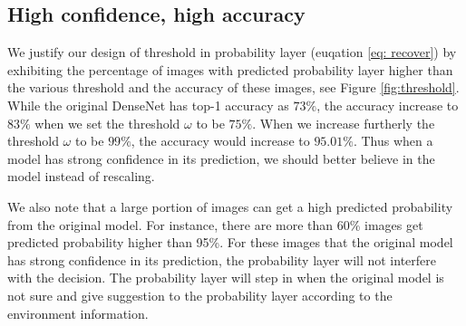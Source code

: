 \documentclass[pageno]{jpaper}
\begin{document}
\subsection{High confidence, high accuracy}
We justify our design of threshold in probability layer (euqation \ref{eq: recover}) by exhibiting the percentage of images with predicted probability layer higher than the various threshold and the accuracy of these images, see Figure \ref{fig:threshold}. While the original DenseNet has top-1 accuracy as $73\%$, the accuracy increase to $83\%$ when we set the threshold $\omega$ to be $75\%$. When we increase furtherly the threshold $\omega$ to be $99\%$, the accuracy would increase to $95.01\%$. Thus when a model has strong confidence in its prediction, we should better believe in the model instead of rescaling. 

We also note that a large portion of images can get a high predicted probability from the original model. For instance, there are more than 60\% images get predicted probability higher than 95\%. For these images that the original model has strong confidence in its prediction, the probability layer will not interfere with the decision. The probability layer will step in when the original model is not sure and give suggestion to the probability layer according to the environment information. 
\end{document}
